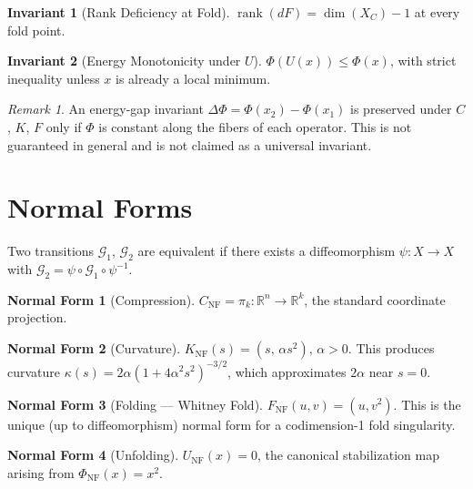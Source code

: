 \documentclass[12pt, oneside]{book}
\theoremstyle{plain}
\theoremstyle{definition}
\newtheorem{invariant}{Invariant}[section]
\newtheorem{normalform}{Normal Form}[section]
\theoremstyle{remark}
\newtheorem{remark}{Remark}[section]
\begin{document}
\begin{invariant}[Rank Deficiency at Fold]
$\operatorname{rank}(dF) = \dim(X_C) - 1$ at every fold point.
\end{invariant}

\begin{invariant}[Energy Monotonicity under $U$]
$\Phi(U(x)) \le \Phi(x)$, with strict inequality unless $x$ is
already a local minimum.
\end{invariant}

\begin{remark}
An energy-gap invariant $\Delta\Phi = \Phi(x_2) - \Phi(x_1)$ is
preserved under $C$, $K$, $F$ only if $\Phi$ is constant along the
fibers of each operator. This is not guaranteed in general and is not
claimed as a universal invariant.
\end{remark}

\section{Normal Forms}

Two transitions $\mathcal{G}_1$, $\mathcal{G}_2$ are equivalent if
there exists a diffeomorphism $\psi : X \to X$ with
$\mathcal{G}_2 = \psi \circ \mathcal{G}_1 \circ \psi^{-1}$.

\begin{normalform}[Compression]
$C_{\mathrm{NF}} = \pi_k : \mathbb{R}^n \to \mathbb{R}^k$, the
standard coordinate projection.
\end{normalform}

\begin{normalform}[Curvature]
$K_{\mathrm{NF}}(s) = (s,\, \alpha s^2)$, $\alpha > 0$. This
produces curvature
$\kappa(s) = 2\alpha(1 + 4\alpha^2 s^2)^{-3/2}$, which approximates
$2\alpha$ near $s = 0$.
\end{normalform}

\begin{normalform}[Folding --- Whitney Fold]
$F_{\mathrm{NF}}(u,v) = (u, v^2)$. This is the unique (up to
diffeomorphism) normal form for a codimension-1 fold singularity.
\end{normalform}

\begin{normalform}[Unfolding]
$U_{\mathrm{NF}}(x) = 0$, the canonical stabilization map arising
from $\Phi_{\mathrm{NF}}(x) = x^2$.
\end{normalform}
\end{document}
